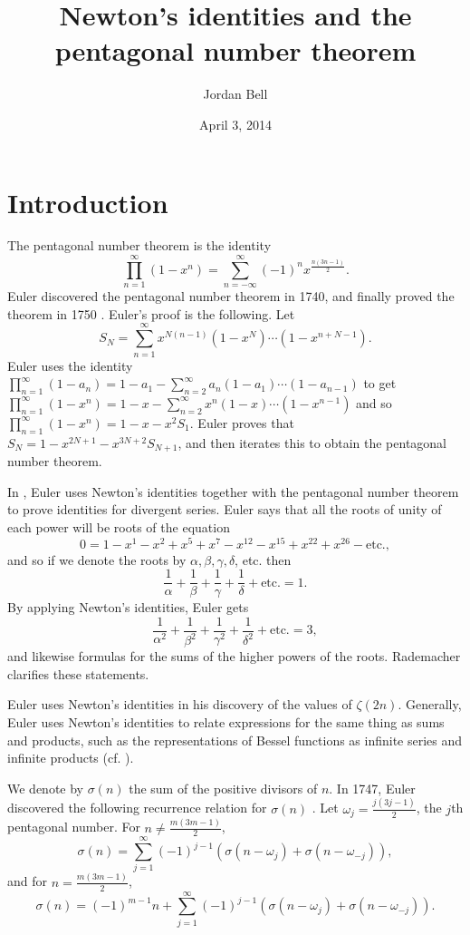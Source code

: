 \documentclass{article}
\theoremstyle{definition}
\begin{document}
\title{Newton's identities and the pentagonal number theorem}
\author{Jordan Bell}
\date{April 3, 2014}
\maketitle


\section{Introduction}
The pentagonal number theorem is the identity
\[
\prod_{n=1}^\infty (1-x^n)=\sum_{n=-\infty}^\infty (-1)^n x^{\frac{n(3n-1)}{2}}.
\]
Euler discovered the pentagonal number theorem in 1740, and finally proved
the theorem in 1750 \cite{bell}. Euler's proof is the following.
Let
\[
S_N=\sum_{n=1}^\infty x^{N(n-1)}(1-x^N)\cdots(1-x^{n+N-1}).
\]
Euler uses the identity $\prod_{n=1}^\infty (1-a_n)=
1-a_1-\sum_{n=2}^\infty a_n(1-a_1)\cdots(1-a_{n-1})$ to get
$\prod_{n=1}^\infty (1-x^n)=1-x-\sum_{n=2}^\infty x^n(1-x)\cdots(1-x^{n-1})$
and so $\prod_{n=1}^\infty (1-x^n)=1-x-x^2S_1$.
Euler proves that $S_N=1-x^{2N+1}-x^{3N+2}S_{N+1}$, and then iterates this
to obtain
the pentagonal number theorem.

In \cite{E542},
Euler uses Newton's identities together with the pentagonal number theorem
to prove identities for divergent series.
Euler says that all the roots of unity of each power will be roots
of the equation
\[
0=1-x^1-x^2+x^5+x^7-x^{12}-x^{15}+x^{22}+x^{26}-\textrm{etc.},
\]
and so if we denote the roots by $\alpha,\beta,\gamma,\delta$, etc. then
\[
\frac{1}{\alpha}+\frac{1}{\beta}+\frac{1}{\gamma}+\frac{1}{\delta}+\textrm{etc.}=1.
\]
By applying Newton's identities, Euler gets
\[
\frac{1}{\alpha^2}+\frac{1}{\beta^2}+\frac{1}{\gamma^2}+
\frac{1}{\delta^2}+\textrm{etc.}=3,
\]
and likewise formulas for the sums of the higher powers of the roots.
Rademacher \cite{MR0262045}
clarifies these statements.

Euler uses Newton's identities
in his discovery of the values of $\zeta(2n)$.
Generally, Euler uses Newton's identities to relate expressions
for the same thing as sums and products,
such as the representations of Bessel functions as infinite
series and infinite products (cf. \cite[pp. 497--503]{watson}).

We denote by $\sigma(n)$ the sum of the positive divisors of $n$.
In 1747, Euler discovered the following recurrence relation
for $\sigma(n)$ \cite[pp. 345--356]{bell}.
Let $\omega_j=\frac{j(3j-1)}{2}$, the $j$th pentagonal number.
For $n \neq \frac{m(3m-1)}{2}$,
\[
\sigma(n)=\sum_{j=1}^\infty (-1)^{j-1}(\sigma(n-\omega_j)+\sigma(n-\omega_{-j})),
\]
and for $n=\frac{m(3m-1)}{2}$,
\[
\sigma(n)=(-1)^{m-1}n+\sum_{j=1}^\infty (-1)^{j-1}(\sigma(n-\omega_j)+
\sigma(n-\omega_{-j})).
\]
\end{document}
